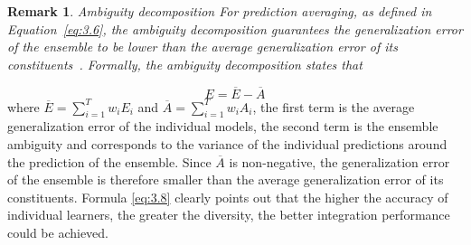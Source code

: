 \documentclass[master]{IPSstyle}
\newtheorem{remark}{Remark}
\begin{document}
{\begin{remark}{Ambiguity decomposition}
For prediction averaging, as defined in Equation~\ref{eq:3.6}, the \textit{ambiguity decomposition} guarantees the generalization error of the ensemble to be lower than the average generalization error of its constituents~\cite{krogh1995neural}. Formally, the ambiguity decomposition states that
\end{remark}
\begin{equation} \label{eq:3.8}
E = \overline{E} - \overline{A}
\end{equation}
where $\overline{E} = \sum_{i=1}^Tw_iE_i$ and $\overline{A} = \sum_{i=1}^Tw_iA_i$,
the first term is the average generalization error of the individual models, the second term is the ensemble ambiguity and corresponds to the variance of the individual predictions around the prediction of the ensemble. Since $\overline{A}$ is non-negative, the generalization error of the ensemble is therefore smaller than the average generalization error of its constituents.
Formula \ref{eq:3.8} clearly points out that the higher the accuracy of individual learners, the greater the diversity, the better integration performance could be achieved. 

}
\end{document}
